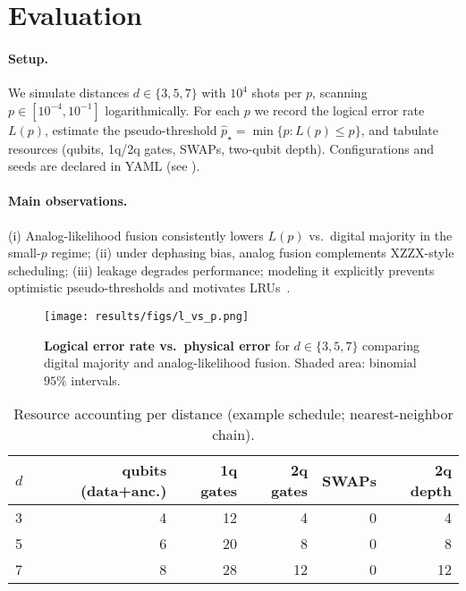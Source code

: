 \documentclass[11pt]{article}
\begin{document}
\section{Evaluation}\label{sec:evaluation}
\paragraph{Setup.}
We simulate distances $d\in\{3,5,7\}$ with $10^4$ shots per $p$, scanning $p\in[10^{-4},10^{-1}]$ logarithmically. For each $p$ we record the logical error rate $L(p)$, estimate the pseudo-threshold $\hat p_\star=\min\{p: L(p)\le p\}$, and tabulate resources (qubits, 1q/2q gates, SWAPs, two-qubit depth). Configurations and seeds are declared in YAML (see ).

\paragraph{Main observations.}
(i) Analog-likelihood fusion consistently lowers $L(p)$ vs.\ digital majority in the small-$p$ regime; (ii) under dephasing bias, analog fusion complements XZZX-style scheduling; (iii) leakage degrades performance; modeling it explicitly prevents optimistic pseudo-thresholds and motivates LRUs~\cite{LRUAllMWPRL2023,CouplerLRU2024}.

\begin{figure}[t]
  \centering
  \texttt{[image: results/figs/l\_vs\_p.png]}
  \caption{\textbf{Logical error rate vs.\ physical error} for $d\in\{3,5,7\}$ comparing digital majority and analog-likelihood fusion. Shaded area: binomial $95\%$ intervals.}
  \label{fig:main}
\end{figure}

\begin{table}[t]
  \centering
  \caption{Resource accounting per distance (example schedule; nearest-neighbor chain).}
  \label{tab:resources}
  \begin{tabular}{lrrrrr}
    \toprule
    $d$ & qubits (data+anc.) & 1q gates & 2q gates & SWAPs & 2q depth \\
    \midrule
    3 & 4 & 12 & 4 & 0 & 4 \\
    5 & 6 & 20 & 8 & 0 & 8 \\
    7 & 8 & 28 & 12 & 0 & 12 \\
    \bottomrule
  \end{tabular}
\end{table}
\end{document}
